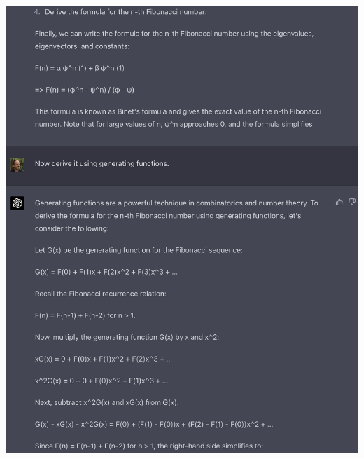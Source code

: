 \begin{mdframed}
\includegraphics[width=400pt]{img/linear-algebra--vector-spaces-and-fields--computing-the-n-th-fibonacci-number-generating-function-f048.png}
\end{mdframed}

